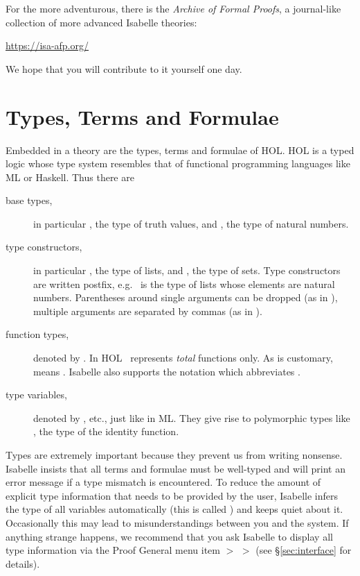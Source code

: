For the more adventurous, there is the \emph{Archive of Formal Proofs},
a journal-like collection of more advanced Isabelle theories:
\begin{center}\small
    \url{https://isa-afp.org/}
\end{center}
We hope that you will contribute to it yourself one day.%


\section{Types, Terms and Formulae}
\label{sec:TypesTermsForms}

Embedded in a theory are the types, terms and formulae of HOL\@. HOL is a typed
logic whose type system resembles that of functional programming languages
like ML or Haskell. Thus there are
\begin{description}
\item[base types,] 
in particular , the type of truth values,
and , the type of natural numbers.
\item[type constructors,]
 in particular , the type of
lists, and , the type of sets. Type constructors are written
postfix, e.g.\  is the type of lists whose elements are
natural numbers. Parentheses around single arguments can be dropped (as in
), multiple arguments are separated by commas (as in
).
\item[function types,]
denoted by \isasymFun{}.
  In HOL \isasymFun\ represents \emph{total} functions only. As is customary,
   means
  . Isabelle also
  supports the notation 
  which abbreviates .
\item[type variables,]
  denoted by ,  etc., just like in ML\@. They give rise
  to polymorphic types like , the type of the identity
  function.
\end{description}
\begin{warn}
  Types are extremely important because they prevent us from writing
  nonsense.  Isabelle insists that all terms and formulae must be
  well-typed and will print an error message if a type mismatch is
  encountered. To reduce the amount of explicit type information that
  needs to be provided by the user, Isabelle infers the type of all
  variables automatically (this is called )
  and keeps quiet about it. Occasionally this may lead to
  misunderstandings between you and the system. If anything strange
  happens, we recommend that you ask Isabelle to display all type
  information via the Proof General menu item  $>$
   $>$  (see \S\ref{sec:interface}
  for details).
\end{warn}%


